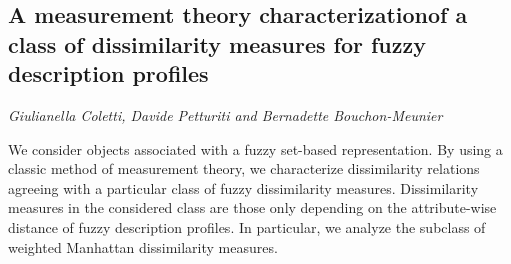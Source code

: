 \documentclass[../booklet.tex]{subfiles}
\begin{document}
\subsection[A measurement theory characterizationof a class of dissimilarity measures for fuzzy description profiles. {\it Giulianella Coletti, Davide Petturiti and Bernadette Bouchon-Meunier}]{A measurement theory characterizationof a class of dissimilarity measures for fuzzy description profiles}
  

\begin{center}
  {\it Giulianella Coletti, Davide Petturiti and Bernadette Bouchon-Meunier}
\end{center}




We consider objects associated with a fuzzy set-based
representation. By using a classic method of measurement
theory, we characterize dissimilarity relations agreeing with a particular class of fuzzy dissimilarity
measures. Dissimilarity measures in the considered class are those only depending on the attribute-wise distance of fuzzy description profiles. In particular, we analyze the subclass of weighted Manhattan dissimilarity measures.

\end{document}
